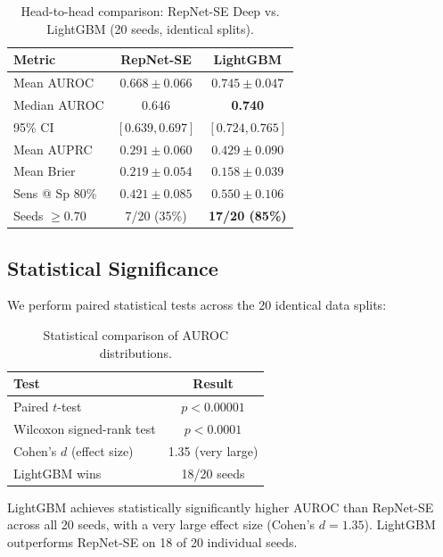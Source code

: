 \documentclass[11pt,a4paper]{article}
\begin{document}
\begin{table}[H]
\centering
\caption{Head-to-head comparison: RepNet-SE Deep vs. LightGBM (20 seeds, identical splits).}
\label{tab:comparison}
\begin{tabular}{lcc}
\toprule
\textbf{Metric} & \textbf{RepNet-SE} & \textbf{LightGBM} \\
\midrule
Mean AUROC & $0.668 \pm 0.066$ & $\mathbf{0.745 \pm 0.047}$ \\
Median AUROC & 0.646 & \textbf{0.740} \\
95\% CI & $[0.639, 0.697]$ & $\mathbf{[0.724, 0.765]}$ \\
Mean AUPRC & $0.291 \pm 0.060$ & $\mathbf{0.429 \pm 0.090}$ \\
Mean Brier & $0.219 \pm 0.054$ & $\mathbf{0.158 \pm 0.039}$ \\
Sens @ Sp 80\% & $0.421 \pm 0.085$ & $\mathbf{0.550 \pm 0.106}$ \\
Seeds $\geq 0.70$ & 7/20 (35\%) & \textbf{17/20 (85\%)} \\
\bottomrule
\end{tabular}
\end{table}

\subsection{Statistical Significance}

We perform paired statistical tests across the 20 identical data splits:

\begin{table}[H]
\centering
\caption{Statistical comparison of AUROC distributions.}
\label{tab:stats}
\begin{tabular}{lc}
\toprule
\textbf{Test} & \textbf{Result} \\
\midrule
Paired $t$-test & $p < 0.00001$ \\
Wilcoxon signed-rank test & $p < 0.0001$ \\
Cohen's $d$ (effect size) & 1.35 (very large) \\
LightGBM wins & 18/20 seeds \\
\bottomrule
\end{tabular}
\end{table}

LightGBM achieves statistically significantly higher AUROC than RepNet-SE across all 20 seeds, with a very large effect size (Cohen's $d = 1.35$). LightGBM outperforms RepNet-SE on 18 of 20 individual seeds.


\end{document}
